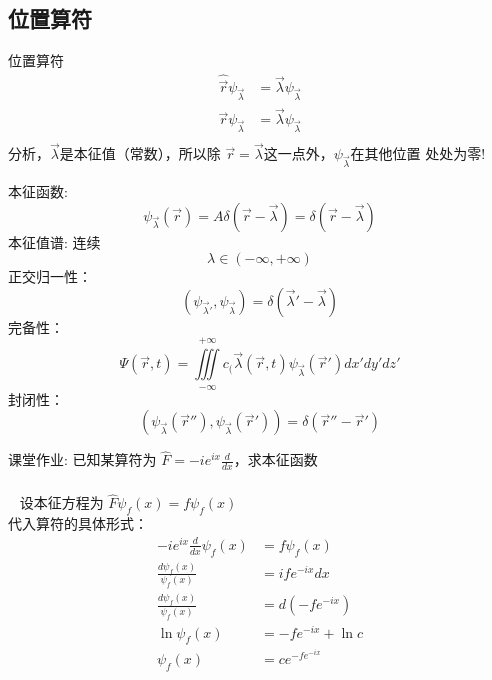 \subsection{位置算符}

\begin{frame} {位置算符}
    \例[2.求解位置算符本征方程]{  
    \[\hat{\vec r}\psi_{\vec \lambda}=\vec \lambda \psi_{\vec \lambda}\]}   
    \解~  
    \begin{equation*}
        \begin{split}
            \hat{\vec r}\psi_{\vec \lambda}&=\vec \lambda \psi_{\vec \lambda} \\
            \vec{r}\psi_{\vec \lambda}&=\vec \lambda \psi_{\vec \lambda} \\
        \end{split} 
    \end{equation*}
    分析，$\vec \lambda$是本征值（常数），所以除 $\vec r =\vec \lambda $这一点外，$\psi_{\vec \lambda}$在其他位置
    处处为零!\\
\end{frame} 

\begin{frame} 
    本征函数: $$ \psi_{\vec \lambda}(\vec{r})= A \delta(\vec{r}-\vec{\lambda})= \delta(\vec{r}-\vec{\lambda})$$
    本征值谱: 连续
        $$ \lambda \in (-\infty, +\infty) $$
    正交归一性：
        $$ (\psi_{\vec{\lambda}'}, \psi_{\vec{\lambda}}) =\delta(\vec{\lambda}'-\vec{\lambda})$$
    完备性：
    $$ \Psi(\vec{r},t)=\iiint\limits_{-\infty}^{+\infty}c_(\vec{\lambda}(\vec{r},t) \psi_{\vec{\lambda}}(\vec{r}') dx'dy'dz' $$
    封闭性：$$ (\psi_{\vec{\lambda}}(\vec{r}''), \psi_{\vec{\lambda}}(\vec{r}')) =\delta(\vec{r}''-\vec{r}')$$
\end{frame} 

\begin{frame}
    \begin{tcolorbox2}{课堂作业:}
        已知某算符为  $\hat{F}=-ie^{ix}\frac{d}{dx}$，求本征函数 \\  
     \end{tcolorbox2}
\end{frame} 

\begin{frame} 
    \frametitle{}
    \解~ 设本征方程为 $\hat{F}\psi_f(x)=f\psi_f(x)$\\
    代入算符的具体形式：
    \begin{equation*}
        \begin{split}
            -ie^{ix}\frac{d}{dx}\psi_f(x)&=f\psi_f(x) \\
            \frac{d\psi_f(x)}{\psi_f(x)}&=ife^{-ix} dx \\
            \frac{d\psi_f(x)}{\psi_f(x)}&=d(-fe^{-ix}) \\
           \ln{\psi_f(x)}&=-fe^{-ix}+\ln c \\
           \psi_f(x)&=c e^{-fe^{-ix}}
        \end{split} 
    \end{equation*}
\end{frame} 

